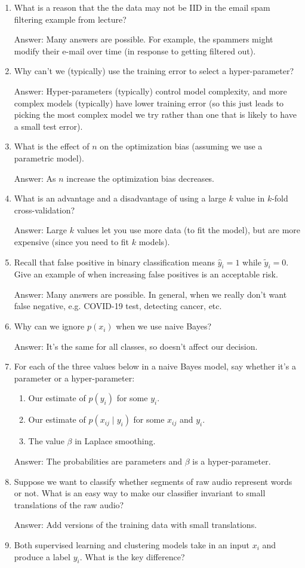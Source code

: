 \documentclass{article}
\def\ans#1{\par\gre{Answer: #1}}
\def\gre#1{{\color{gre}#1}}
\def\cond{\; | \;}
\def\enum#1{\begin{enumerate}#1\end{enumerate}}
\begin{document}
	\enum{
		\item What is a reason that the the data may not be IID in the email spam filtering example from lecture?
		\ans{Many answers are possible. For example, the spammers might modify their e-mail over time (in response to getting filtered out).}
		\item Why can't we (typically) use the training error to select a hyper-parameter?
		\ans{Hyper-parameters (typically) control model complexity, and more complex models (typically) have lower training error (so this just leads to picking the most complex model we try rather than one that is likely to have a small test error).
		}
		\item What is the effect of $n$ on the optimization bias (assuming we use a parametric model).
		\ans{As $n$ increase the optimization bias decreases.}
		\item What is an advantage and a disadvantage of using a large $k$ value in $k$-fold cross-validation?
		\ans{ Large $k$ values let you use more data (to fit the model), but are more expensive (since you need to fit $k$ models).
		}
		\item Recall that false positive in binary classification means $\hat y_i=1$ while $\tilde y_i = 0$. Give an example of when increasing false positives is an acceptable risk.
		\ans{Many answers are possible. In general, when we really don't want false negative, e.g. COVID-19 test, detecting cancer, etc.}
		\item Why can we ignore $p(x_i)$ when we use naive Bayes?
		\ans{It's the same for all classes, so doesn't affect our decision.}
		\item For each of the three values below in a naive Bayes model, say whether it's a parameter or a hyper-parameter:
		\begin{enumerate}
			\item Our estimate of $p(y_i)$ for some $y_i$.
			\item Our estimate of $p(x_{ij} \cond y_i)$ for some $x_{ij}$ and $y_i$.
			\item The value $\beta$ in Laplace smoothing.
		\end{enumerate}
		\ans{The probabilities are parameters and $\beta$ is a hyper-parameter.}
		\item Suppose we want to classify whether segments of raw audio represent words or not. What is an easy way to make our classifier invariant to small translations of the raw audio?
		\ans{Add versions of the training data with small translations.}
		\item Both supervised learning and clustering models take in an input $x_i$ and produce a label $y_i$. What is the key difference?
}
\end{document}
